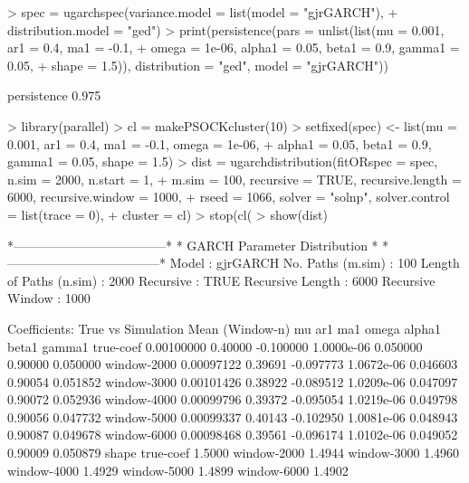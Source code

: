 \begin{Schunk}
\begin{Sinput}
> spec = ugarchspec(variance.model = list(model = "gjrGARCH"),
+     distribution.model = "ged")
> print(persistence(pars = unlist(list(mu = 0.001, ar1 = 0.4, ma1 = -0.1,
+     omega = 1e-06, alpha1 = 0.05, beta1 = 0.9, gamma1 = 0.05,
+     shape = 1.5)), distribution = "ged", model = "gjrGARCH"))
\end{Sinput}
\begin{Soutput}
persistence
      0.975
\end{Soutput}
\begin{Sinput}
> library(parallel)
> cl = makePSOCKcluster(10)
> setfixed(spec) <- list(mu = 0.001, ar1 = 0.4, ma1 = -0.1, omega = 1e-06,
+     alpha1 = 0.05, beta1 = 0.9, gamma1 = 0.05, shape = 1.5)
> dist = ugarchdistribution(fitORspec = spec, n.sim = 2000, n.start = 1,
+     m.sim = 100, recursive = TRUE, recursive.length = 6000, recursive.window = 1000,
+     rseed = 1066, solver = "solnp", solver.control = list(trace = 0),
+     cluster = cl)
> stop(cl(
> show(dist)
\end{Sinput}
\begin{Soutput}
*------------------------------------*
*    GARCH Parameter Distribution    *
*------------------------------------*
Model : gjrGARCH
No. Paths (m.sim) : 100
Length of Paths (n.sim) : 2000
Recursive : TRUE
Recursive Length : 6000
Recursive Window : 1000

Coefficients: True vs Simulation Mean (Window-n)
                    mu     ar1       ma1      omega   alpha1   beta1   gamma1
true-coef   0.00100000 0.40000 -0.100000 1.0000e-06 0.050000 0.90000 0.050000
window-2000 0.00097122 0.39691 -0.097773 1.0672e-06 0.046603 0.90054 0.051852
window-3000 0.00101426 0.38922 -0.089512 1.0209e-06 0.047097 0.90072 0.052936
window-4000 0.00099796 0.39372 -0.095054 1.0219e-06 0.049798 0.90056 0.047732
window-5000 0.00099337 0.40143 -0.102950 1.0081e-06 0.048943 0.90087 0.049678
window-6000 0.00098468 0.39561 -0.096174 1.0102e-06 0.049052 0.90009 0.050879
             shape
true-coef   1.5000
window-2000 1.4944
window-3000 1.4960
window-4000 1.4929
window-5000 1.4899
window-6000 1.4902
\end{Soutput}
\end{Schunk}

